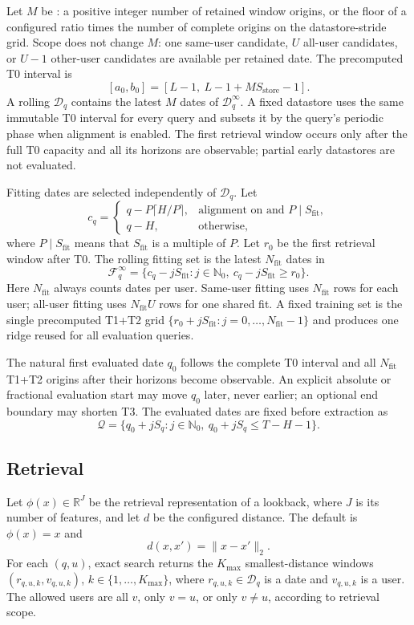 \documentclass[11pt]{article}
\newcommand{\Nfit}{N_{\mathrm{fit}}}
\newcommand{\Sstore}{S_{\mathrm{store}}}
\newcommand{\Sfit}{S_{\mathrm{fit}}}
\newcommand{\Sq}{S_q}
\newcommand{\Kmax}{K_{\max}}
\newcommand{\code}[1]{\texttt{\detokenize{#1}}}
\begin{document}
Let $M$ be \code{N\_datastore\_dates}: a positive integer number of retained
window origins, or the floor of a configured ratio times the number of complete
origins on the datastore-stride grid. Scope does not change $M$: one same-user candidate, $U$ all-user
candidates, or $U-1$ other-user candidates are available per retained date.
The precomputed T0 interval is
\[
 [a_0,b_0]=[L-1,\ L-1+M\Sstore-1].                            \tag{4}
\]
A rolling $\mathcal D_q$ contains the latest $M$ dates of
$\mathcal D_q^\infty$. A fixed datastore uses the same immutable T0 interval
for every query and subsets it by the query's periodic phase when alignment is
enabled. The first retrieval window occurs only after the full T0 capacity and
all its horizons are observable; partial early datastores are not evaluated.

Fitting dates are selected independently of $\mathcal D_q$. Let
\[
 c_q=
 \begin{cases}
 q-P\lceil H/P\rceil,
   & \text{alignment on and }P\mid\Sfit,\\
 q-H, & \text{otherwise},
 \end{cases}
\]
where $P\mid\Sfit$ means that $\Sfit$ is a multiple of $P$. Let $r_0$ be the
first retrieval window after T0. The rolling fitting set is the latest
$\Nfit$ dates in
\[
 \mathcal F_q^\infty
 =\{c_q-j\Sfit:j\in\mathbb N_0,\ c_q-j\Sfit\ge r_0\}.        \tag{5}
\]
Here $\Nfit$ always counts dates per user. Same-user fitting uses $\Nfit$
rows for each user; all-user fitting uses $\Nfit U$ rows for one shared fit.
A fixed training set is the single precomputed T1+T2 grid
$\{r_0+j\Sfit:j=0,\ldots,\Nfit-1\}$ and produces one ridge reused for all
evaluation queries.

The natural first evaluated date $q_0$ follows the complete T0 interval and
all $\Nfit$ T1+T2 origins after their horizons become observable. An explicit
absolute or fractional evaluation start may move $q_0$ later, never earlier;
an optional end boundary may shorten T3. The evaluated dates are fixed before
extraction as
\[
 \mathcal Q=\{q_0+j\Sq:j\in\mathbb N_0,\ q_0+j\Sq\le T-H-1\}.\tag{6}
\]

\subsection{Retrieval}

Let $\phi(x)\in\mathbb R^J$ be the retrieval representation of a lookback,
where $J$ is its number of features, and let $d$ be the configured distance.
The default is $\phi(x)=x$ and
\[
 d(x,x')=\|x-x'\|_2.                                         \tag{7}
\]
For each $(q,u)$, exact search returns the $\Kmax$ smallest-distance windows
$(r_{q,u,k},v_{q,u,k})$, $k\in\{1,\ldots,\Kmax\}$, where
$r_{q,u,k}\in\mathcal D_q$ is a date and $v_{q,u,k}$ is a user. The allowed
users are all $v$, only $v=u$, or only $v\ne u$, according to retrieval scope.
\end{document}
